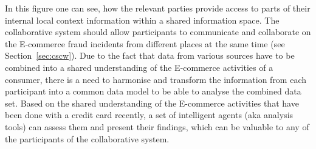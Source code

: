 In this figure one can see, how the relevant parties provide access to parts of their internal local context information within a shared information space. The collaborative system should allow participants to communicate and collaborate on the \gls{E-commerce} fraud incidents from different places at the same time (see Section~\ref{sec:cscw}). Due to the fact that data from various sources have to be combined into a shared understanding of the \gls{E-commerce} activities of a consumer, there is a need to harmonise and transform the information from each participant into a common data model to be able to analyse the combined data set. Based on the shared understanding of the \gls{E-commerce} activities that have been done with a credit card recently, a set of intelligent agents (aka analysis tools) can assess them and present their findings, which can be valuable to any of the participants of the collaborative system.

